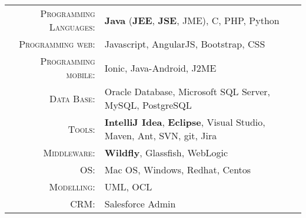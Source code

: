 %
%
%

\renewcommand{\arraystretch}{1.1}

	\begin{tabular}{>{}r>{}p{13cm}}
		\textsc{Programming Languages:}  		    &   \textbf{Java} (\textbf{JEE}, \textbf{JSE}, JME), C, PHP, Python\\
		\textsc{Programming web:}               	&   Javascript, AngularJS, Bootstrap, CSS\\
		\textsc{Programming mobile:}               	&   Ionic, Java-Android, J2ME\\ 
		\textsc{Data Base:}                         &   Oracle Database, Microsoft SQL Server, MySQL, PostgreSQL \\
		\textsc{Tools:}	  		                    &   \textbf {IntelliJ Idea}, \textbf {Eclipse}, Visual Studio, Maven, Ant, SVN, git, Jira\\
		\textsc{Middleware:}				        &   \textbf{Wildfly}, Glassfish, WebLogic\\
		\textsc{OS:}	                            &   Mac OS, Windows, Redhat, Centos\\
		\textsc{Modelling:}				            &   UML, OCL\\
		\textsc{CRM:}				                &   Salesforce Admin\\
	\end{tabular}
